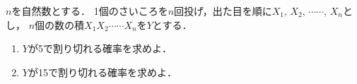 \documentclass[../../main.tex]{subfiles}
\begin{document}
$n$を自然数とする．
1個のさいころを$n$回投げ，出た目を順に$X_1, \, X_2, \, \cdots\cdots, \, X_n$とし，
$n$個の数の積$X_1 X_2 \cdots \cdots X_n$を$Y$とする．
\begin{enumerate}
  \item$Y$が5で割り切れる確率を求めよ．
  \item$Y$が15で割り切れる確率を求めよ．
\end{enumerate}
\end{document}
